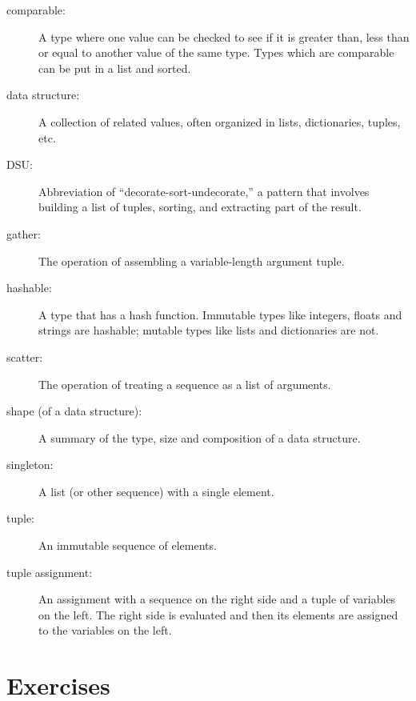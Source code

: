 \begin{description}

\item[comparable:] A type where one value can be checked to see if it is
greater than, less than or equal to another value of the same type.
Types which are comparable can be put in a list and sorted.

\item[data structure:] A collection of related values, often
organized in lists, dictionaries, tuples, etc.

\item[DSU:] Abbreviation of ``decorate-sort-undecorate,'' a
pattern that involves building a list of tuples, sorting, and
extracting part of the result.

\item[gather:] The operation of assembling a variable-length
argument tuple.

\item[hashable:] A type that has a hash function.  Immutable
types like integers,
floats and strings are hashable; mutable types like lists and
dictionaries are not.

\item[scatter:] The operation of treating a sequence as a list of
arguments.

\item[shape (of a data structure):] A summary of the type,
size and composition of a data structure.

\item[singleton:] A list (or other sequence) with a single element.

\item[tuple:] An immutable sequence of elements.

\item[tuple assignment:] An assignment with a sequence on the
right side and a tuple of variables on the left.  The right
side is evaluated and then its elements are assigned to the
variables on the left.

\end{description}


\section{Exercises}

